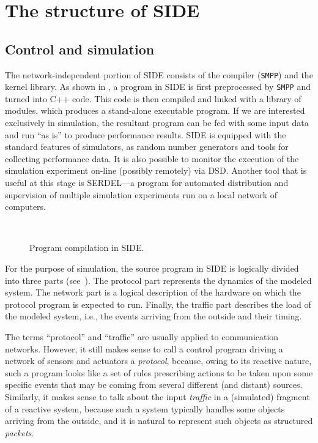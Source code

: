 \section{The structure of SIDE}

\subsection{Control and simulation}

The network-independent portion of SIDE consists of the compiler ({\tt SMPP})
and the kernel library.
As shown in ,
a program in SIDE is first preprocessed by {\tt SMPP} and turned into
C++ code.
This code is then compiled and linked with a library of modules, which
produces a stand-alone executable program.
If we are interested exclusively in simulation, the resultant program can
be fed with some input data and run ``as is'' to produce performance results.
SIDE is equipped with the standard features of simulators, as random number
generators and tools for collecting performance data.
It is also possible to monitor the execution of the simulation experiment
on-line (possibly remotely) via DSD.
Another tool that is useful at this stage is SERDEL---a program for automated
distribution and supervision of multiple simulation experiments run on a
local network of computers.

\begin{figure}[htbp]%
\begin{center}
\ 
\vspace{0.75cm}
\caption{Program compilation in SIDE.\label{fig.struct1}}
\end{center}
\end{figure}

For the purpose of simulation, the source program in SIDE is logically
divided into three parts (see~).
The protocol part represents the dynamics of the modeled system.
The network part is a logical description of the hardware on which the
protocol program is expected to run.
Finally, the traffic part describes the load of the modeled
system, i.e., the events arriving from the outside and their
timing.

The terms ``protocol'' and ``traffic'' are usually applied to
communication networks.
However, it still makes sense to call a control program driving a network
of sensors and actuators a {\em protocol}, because, owing to its reactive
nature, such a program looks like a set of rules prescribing actions to be
taken upon some specific events that may be coming from several different
(and distant) sources.
Similarly, it makes sense to talk about the input {\em traffic\/} in a
(simulated) fragment of a reactive system, because such a system typically
handles some objects arriving from the outside, and it is natural to
represent such objects as structured {\em packets}.

